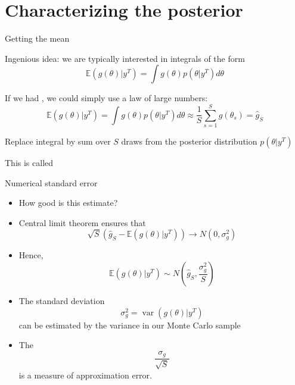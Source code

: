 \section[Posterior]{Characterizing the posterior}
\begin{frame}{Getting the mean}
\begin{witemize}
    \item Ingenious idea: we are typically interested in integrals of the form
    \begin{equation}
    \mathbb{E}\left( {g\left( \theta  \right)|{y^T}} \right) = \int {g\left( \theta  \right)p\left( {\theta |{y^T}} \right)d\theta }
    \end{equation}
    \item If we had , we could simply use a law of large numbers:
    \begin{equation}
    \mathbb{E}\left( {g\left( \theta  \right)|{y^T}} \right) = \int {g\left( \theta  \right)p\left( {\theta |{y^T}} \right)d\theta }  \approx \frac{1}{S}\sum\limits_{s = 1}^S {g\left( {{\theta _s}} \right)} =\hat g_S
    \end{equation}
    \item Replace integral by sum over $S$ draws from the posterior distribution $p(\theta|y^T)$
    \item This is called 
    \end{witemize}
\end{frame}

\begin{frame}{Numerical standard error}
\begin{itemize}
    \item How good is this estimate?
    \item Central limit theorem ensures that
        \begin{equation}
        \sqrt S \left( {{{\hat g}_S} - \mathbb{E}\left( {g\left( \theta  \right)|{y^T}} \right)} \right) \to N\left( {0,\sigma _g^2} \right)
        \end{equation}
    \item Hence,
    \begin{equation}
    \mathbb{E}\left( {g\left( \theta  \right)|{y^T}} \right) \sim N\left( {{{\hat g}_S},\frac{{\sigma _g^2}}{S}} \right)
    \end{equation}
    \item The standard deviation
        \begin{equation}
        \sigma _g^2=\operatorname{var}(g(\theta)|y^T)
        \end{equation}
        can be estimated by the variance in our Monte Carlo sample
    \item The 
    \begin{equation}
    \frac{{\sigma _g}}{\sqrt S}
    \end{equation}
    is a measure of approximation error.
\end{itemize}
\end{frame}

